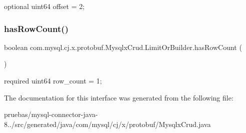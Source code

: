 {\ttfamily optional uint64 offset = 2;} \mbox{\label{interfacecom_1_1mysql_1_1cj_1_1x_1_1protobuf_1_1_mysqlx_crud_1_1_limit_or_builder_af9a2614f49f0fbf2cfc5fab29f73634f}} 
\subsubsection{\texorpdfstring{has\+Row\+Count()}{hasRowCount()}}
{\footnotesize\ttfamily boolean com.\+mysql.\+cj.\+x.\+protobuf.\+Mysqlx\+Crud.\+Limit\+Or\+Builder.\+has\+Row\+Count (\begin{DoxyParamCaption}{ }\end{DoxyParamCaption})}

{\ttfamily required uint64 row\+\_\+count = 1;} 

The documentation for this interface was generated from the following file\+:\begin{DoxyCompactItemize}
\item 
pruebas/mysql-\/connector-\/java-\/8../src/generated/java/com/mysql/cj/x/protobuf/Mysqlx\+Crud.\+java\end{DoxyCompactItemize}
